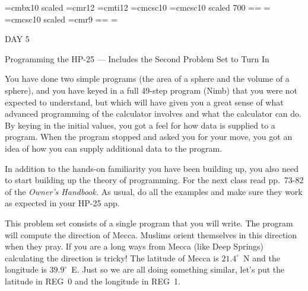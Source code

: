 
\def\folio{\ifnum\pageno>0 \number\pageno \else
   \ifnum\pageno<0 \romannumeral-\pageno \else\fi\fi}

\font\largebf=cmbx10  scaled 
\font\largerm=cmr12
\font\largeit=cmti12
\font\tensc=cmcsc10
\font\sevensc=cmcsc10 scaled 700
\newfam\scfam \def\sc{\fam\scfam\tensc}
\textfont\scfam=\tensc \scriptfont\scfam=\sevensc
\scriptscriptfont\scfam=\sevensc
\font\largesc=cmcsc10 scaled 
\font\ninerm=cmr9
\newfam\srfam \def\sr{\fam\srfam\ninerm}
\textfont\srfam=\ninerm \scriptfont\srfam=\sevenrm
\scriptscriptfont\srfam=\fiverm




\null\vskip36pt

\centerline{\largerm DAY 5}
\nobreak\bigskip

\centerline{\largeit Programming the HP-25 --- Includes the Second Problem Set to Turn In}
\nobreak\bigskip

\nobreak\bigskip

\noindent You have done two simple programs (the area of a sphere and the volume of a sphere), and you have keyed in a full 49-step program (Nimb) that you were not expected to understand, but which will have given you a great sense of what advanced programming of the calculator involves and what the calculator can do. By keying in the initial values, you got a feel for how data is supplied to a program. When the program stopped and asked you for your move, you got an idea of how you can supply additional data to the program.

\bigskip

\nobreak\bigskip

\noindent In addition to the hands-on familiarity you have been building up, you also need to start building up the theory of programming. For the next class read pp.~73-82 of the {\it Owner's Handbook.} As usual, do all the examples and make sure they work as expected in your HP-25 app.

\bigskip

\nobreak\bigskip

\noindent This problem set consists of a single program that you will write. The program will compute the direction of Mecca. Muslims orient themselves in this direction when they pray. If you are a long ways from Mecca (like Deep Springs) calculating the direction is tricky! The latitude of Mecca is $21.4^{\circ}$~N and the longitude is $39.9^{\circ}$~E. Just so we are all doing something similar, let's put the latitude in REG~0 and the longitude in REG~1.

